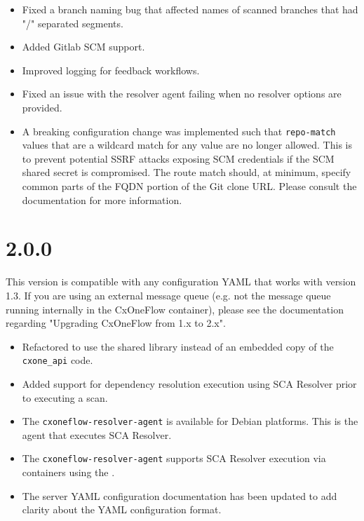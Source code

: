 \begin{itemize}
    \item Fixed a branch naming bug that affected names of scanned branches that had "/" separated segments.
    \item Added Gitlab SCM support.
    \item Improved logging for feedback workflows.
    \item Fixed an issue with the resolver agent failing when no resolver options are provided.
    \item A breaking configuration change was implemented such that \texttt{repo-match} values that are a wildcard
          match for any value are no longer allowed.  This is to prevent potential SSRF attacks exposing SCM credentials
          if the SCM shared secret is compromised.  The route match should, at minimum, specify common parts of the FQDN
          portion of the Git clone URL. Please consult the documentation for more information.
\end{itemize}


\section{2.0.0}

This version is compatible with any configuration YAML that works with version 1.3.  If you are using an external message queue (e.g. not the
message queue running internally in the CxOneFlow container), please see the documentation regarding "Upgrading CxOneFlow from 1.x to 2.x".

\begin{itemize}
    \item Refactored to use the shared library \space instead
    of an embedded copy of the \texttt{cxone\_api} code.
    \item Added support for dependency resolution execution using SCA Resolver prior to executing a scan.
    \item The \texttt{cxoneflow-resolver-agent} is available for Debian platforms.  This is the agent that executes SCA Resolver.
    \item The \texttt{cxoneflow-resolver-agent} supports SCA Resolver execution via containers using the \toolkit.
    \item The server YAML configuration documentation has been updated to add clarity about the YAML configuration format.
\end{itemize}


